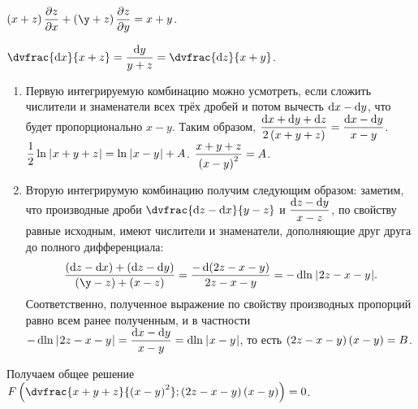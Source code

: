 \documentclass[a5paper,10pt]{article}
\begin{document}
    $\br{x + z} \parder{z} {x} + \br{\y + z} \parder{z} {y} = x + y$.
    
    $\dvfrac {\di x} {x + z} = \dfrac {\di y} {y + z} = \dvfrac {\di z} {x  + y}$.
    
    \begin{enumerate}
        \item Первую интегрируемую комбинацию можно усмотреть, если
        сложить числители и знаменатели всех трёх дробей и потом вычесть $\di x - \di y$,
        что будет пропорционально $x - y$.
        Таким образом,
        $\dfrac {\di x + \di y + \di z} {2\br{x + y + z}} = \dfrac {\di x - \di y} {x - y}$.
        $\dfrac {1} {2} \ln\hspace{0.2mm}\left|\hspace{0.06em}x + y + z\hspace{0.06em}\right| = \ln\hspace{0.2mm}\left|\hspace{0.06em}x - y\hspace{0.06em}\right| + A$.
        $\dfrac {x + y + z} {\left(\hspace{0.01em}x - y\hspace{0.01em}\right)^2} = A$.
        
        \item Вторую интегрирумую комбинацию получим следующим образом: заметим,
        что производные дроби
        $\dvfrac {\di z - \di x}{y - z}$ и $\dfrac {\di z - \di y}{x - z}$,
        по свойству равные исходным, имеют числители и знаменатели, 
        дополняющие друг друга до полного дифференциала:
        $$\dfrac {\br{\di z - \di x} + \br{\di z - \di y}}{\br{\y - z} + \br{x - z}}
        = \dfrac {-\di{\br{2z - x - y}}} {2z - x - y}
        = - \di{\ln\vbr{2z - x - y}}.$$
        Соответственно, полученное выражение по свойству производных пропорций равно
        всем ранее полученным, и в частности
        $- \di{\ln\vbr{2z - x - y}} = \dfrac {\di x - \di y} {x - y} = \di{\ln\vbr{x - y}}$,
        то есть
        $\left(\hspace{0.01em}2z - x - y\hspace{0.01em}\right)\left(\hspace{0.01em}x - y\hspace{0.01em}\right) = B$.
    \end{enumerate}
    
    Получаем общее решение
    $F\br{\dvfrac{x + y + z} {\br{x - y}^2}; \br{2z - x - y}\br{x - y}} = 0$.
\end{document}
